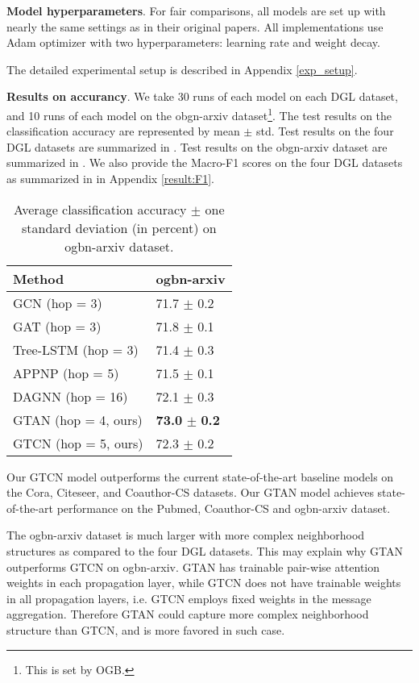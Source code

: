 \documentclass[lettersize,journal]{IEEEtran}
\theoremstyle{plain}
\theoremstyle{definition}
\theoremstyle{remark}
\begin{document}
\textbf{Model hyperparameters}. For fair comparisons, all models are set up with nearly the same settings as in their original papers. All implementations use Adam optimizer with two hyperparameters: learning rate and weight decay.

The detailed experimental setup is described in Appendix \ref{exp_setup}.

\textbf{Results on accurancy}. We take 30 runs of each model on each DGL dataset, and 10 runs of each model on the obgn-arxiv dataset\footnote{This is set by OGB.}. The test results on the classification accuracy are represented by mean $\pm$ std. Test results on the four DGL datasets are summarized in . Test results on the obgn-arxiv dataset are summarized in . We also provide the Macro-F1 scores on the four DGL datasets as summarized in  in Appendix \ref{result:F1}.

\begin{table}[ht]
	\caption{Average classification accuracy $\pm$ one standard deviation (in percent) on ogbn-arxiv dataset.}
	\label{tb:result_ogb}
	\begin{center}
			\begin{tabular}{ll}
				\toprule
				\textbf{Method} &\textbf{ogbn-arxiv}\\
				\midrule
				GCN (hop = 3)  &71.7 $\pm$ 0.2 \\
				GAT (hop = 3) &71.8 $\pm$ 0.1 \\
				Tree-LSTM (hop = 3) &71.4 $\pm$ 0.3 \\
				APPNP (hop = 5) &71.5 $\pm$ 0.1 \\
				DAGNN (hop = 16) &72.1 $\pm$ 0.3 \\
				\midrule
				GTAN (hop = 4, ours) &\textbf{73.0} $\pm$ \textbf{0.2}\\
				GTCN (hop = 5, ours) &72.3 $\pm$ 0.2\\
				\bottomrule
			\end{tabular}
	\end{center}
\end{table}

Our GTCN model outperforms the current state-of-the-art baseline models on the Cora, Citeseer, and Coauthor-CS datasets. Our GTAN model achieves state-of-the-art performance on the Pubmed, Coauthor-CS and ogbn-arxiv dataset.

The ogbn-arxiv dataset is much larger with more complex neighborhood structures as compared to the four DGL datasets. This may explain why GTAN outperforms GTCN on ogbn-arxiv. GTAN has trainable pair-wise attention weights in each propagation layer, while GTCN does not have trainable weights in all propagation layers, i.e. GTCN employs fixed weights in the message aggregation. Therefore GTAN could capture more complex neighborhood structure than GTCN, and is more favored in such case.
\end{document}
